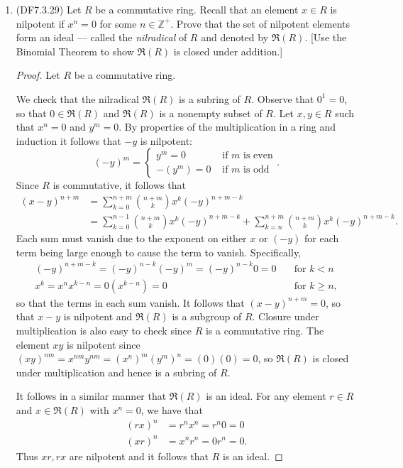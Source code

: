 \documentclass[11pt]{article}
\begin{document}
\begin{enumerate}
    \item (DF7.3.29) Let $R$ be a commutative ring. Recall that an element $x\in R$ is nilpotent if $x^n=0$ for some $n\in \mathbb{Z}^+$. Prove that the set of nilpotent elements form an ideal --- called the \textit{nilradical} of $R$ and denoted by $\mathfrak{R}(R)$. [Use the Binomial Theorem to show $\mathfrak{R}(R)$ is closed under addition.]
    \begin{proof}
      Let $R$ be a commutative ring.

      We check that the nilradical $\mathfrak{R}(R)$ is a subring of $R$. Observe that $0^1 = 0$, so that $0\in \mathfrak{R}(R)$ and $\mathfrak{R}(R)$ is a nonempty subset of $R$. Let $x,y\in R$ such that $x^n=0$ and $y^m=0$. By properties of the multiplication in a ring and induction it follows that $-y$ is nilpotent: \[(-y)^m = \begin{cases}
        y^m = 0 &\text{ if $m$ is even}\\
        -(y^m) = 0 &\text{ if $m$ is odd}
      \end{cases}.\] Since $R$ is commutative, it follows that \begin{align*}
        (x-y)^{n+m} &= \sum_{k=0}^{n+m} \binom{n+m}{k}x^k(-y)^{n+m-k}\\
        &= \sum_{k=0}^{n-1} \binom{n+m}{k}x^k(-y)^{n+m-k} + \sum_{k=n}^{n+m} \binom{n+m}{k}x^k(-y)^{n+m-k}.
      \end{align*} Each sum must vanish due to the exponent on either $x$ or $(-y)$ for each term being large enough to cause the term to vanish. Specifically, \begin{align*}
        (-y)^{n+m-k} = (-y)^{n-k}(-y)^m = (-y)^{n-k}0 = 0 &\quad \text{for $k < n$}\\
        x^k = x^nx^{k-n} = 0(x^{k-n}) = 0 &\quad \text{for $k\geq n$},
      \end{align*} so that the terms in each sum vanish. It follows that $(x-y)^{n+m} = 0$, so that $x-y$ is nilpotent and $\mathfrak{R}(R)$ is a subgroup of $R$. Closure under multiplication is also easy to check since $R$ is a commutative ring. The element $xy$ is nilpotent since $(xy)^{nm} = x^{nm}y^{nm} = (x^n)^m(y^m)^n = (0)(0) = 0$, so $\mathfrak{R}(R)$ is closed under multiplication and hence is a subring of $R$.

      It follows in a similar manner that $\mathfrak{R}(R)$ is an ideal. For any element $r\in R$ and $x\in \mathfrak{R}(R)$ with $x^n = 0$, we have that \begin{align*}
        (rx)^n &= r^nx^n = r^n0 = 0\\
        (xr)^n &= x^nr^n = 0r^n = 0.
      \end{align*} Thus $xr,rx$ are nilpotent and it follows that $R$ is an ideal.
    \end{proof}
    

\end{enumerate}
\end{document}
